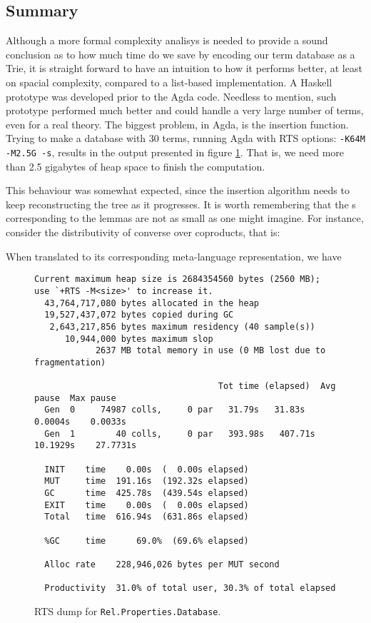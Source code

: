 \subsection{Summary}

Although a more formal complexity analisys is needed to provide a sound conclusion as to
how much time do we save by encoding our term database as a Trie, it is straight forward to have
an intuition to how it performs better, at least on spacial complexity, compared to a list-based
implementation. A Haskell prototype was developed prior to the Agda code. Needless to mention,
such prototype performed much better and could handle a very large number of terms, even for a real theory.
The biggest problem, in Agda, is the insertion function. Trying to make a database with 30 terms,
running Agda with RTS options: \texttt{\small -K64M -M2.5G -s}, results in the output presented
in figure \ref{fig:rtsdump}. That is, we need more than 2.5 gigabytes of heap space to finish
the computation.

This behaviour was somewhat expected, since the insertion algorithm needs to keep
reconstructing the tree as it progresses. It is worth remembering that the s
corresponding to the lemmas are not as small as one might imagine. For instance,
consider the distributivity of converse over coproducts, that is:


When translated to its corresponding meta-language representation, we have


\begin{figure}[h]
\begin{center}
\scriptsize
\begin{verbatim}
Current maximum heap size is 2684354560 bytes (2560 MB);
use `+RTS -M<size>' to increase it.
  43,764,717,080 bytes allocated in the heap
  19,527,437,072 bytes copied during GC
   2,643,217,856 bytes maximum residency (40 sample(s))
      10,944,000 bytes maximum slop
            2637 MB total memory in use (0 MB lost due to fragmentation)

                                    Tot time (elapsed)  Avg pause  Max pause
  Gen  0     74987 colls,     0 par   31.79s   31.83s     0.0004s    0.0033s
  Gen  1        40 colls,     0 par   393.98s   407.71s     10.1929s    27.7731s

  INIT    time    0.00s  (  0.00s elapsed)
  MUT     time  191.16s  (192.32s elapsed)
  GC      time  425.78s  (439.54s elapsed)
  EXIT    time    0.00s  (  0.00s elapsed)
  Total   time  616.94s  (631.86s elapsed)

  %GC     time      69.0%  (69.6% elapsed)

  Alloc rate    228,946,026 bytes per MUT second

  Productivity  31.0% of total user, 30.3% of total elapsed
\end{verbatim}
\end{center}
\caption{RTS dump for \texttt{\small Rel.Properties.Database}.}
\label{fig:rtsdump}
\end{figure}


